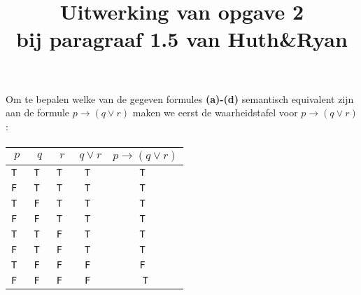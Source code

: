 \documentclass[a4paper,11pt]{article}
\title{Uitwerking van opgave 2\\
\normalsize{bij paragraaf 1.5 van Huth\&Ryan}}
\date{}
\begin{document}
\maketitle


Om te bepalen welke van de gegeven formules \textbf{(a)-(d)} semantisch equivalent
zijn aan de formule $p \rightarrow (q \vee r)$ maken we eerst de waarheidstafel voor
$p \rightarrow (q \vee r)$:

\paragraph{}

\begin{tabular}{c|c|c|c|c}
$p$   & $q$   & $r$   & $q \vee r$ & $p \rightarrow (q \vee r)$ \\
\hline
\tt T & \tt T & \tt T & \tt T      & \tt T \\
\tt F & \tt T & \tt T & \tt T      & \tt T \\
\tt T & \tt F & \tt T & \tt T      & \tt T \\
\tt F & \tt F & \tt T & \tt T      & \tt T \\
\tt T & \tt T & \tt F & \tt T      & \tt T \\
\tt F & \tt T & \tt F & \tt T      & \tt T \\
\tt T & \tt F & \tt F & \tt F      & \tt F \\
\tt F & \tt F & \tt F & \tt F      & \tt T
\end{tabular}

\paragraph{}
\end{document}

